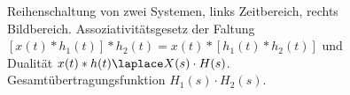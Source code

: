 \begin{figure}
\caption{Reihenschaltung von zwei Systemen, links Zeitbereich, rechts Bildbereich.
Assoziativitätsgesetz der Faltung
$[x(t)\ast h_1(t)]\ast h_2(t) = x(t) \ast [h_1(t)\ast h_2(t)]$
und Dualität $x(t)\ast h(t) \laplace X(s) \cdot H(s)$.
Gesamtübertragungsfunktion $H_1(s) \cdot H_2(s)$.}
\label{fig:tikz_series_081294E23C}
\end{figure}
%
%
%
